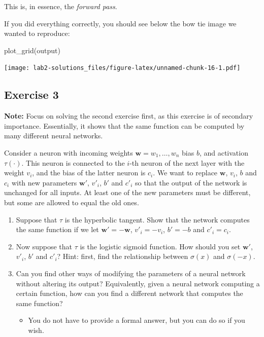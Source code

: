 \documentclass[
]{article}
\newenvironment{Shaded}{\begin{snugshade}}{\end{snugshade}}
\newcommand{\FunctionTok}[1]{\textcolor[rgb]{0.00,0.00,0.00}{#1}}
\newcommand{\NormalTok}[1]{#1}
\providecommand{\tightlist}{%
  \setlength{\itemsep}{0pt}\setlength{\parskip}{0pt}}
\begin{document}
This is, in essence, the \emph{forward pass}.

If you did everything correctly, you should see below the bow tie image
we wanted to reproduce:

\begin{Shaded}
\begin{Highlighting}[]
\FunctionTok{plot\_grid}\NormalTok{(output)}
\end{Highlighting}
\end{Shaded}

\texttt{[image: lab2-solutions\_files/figure-latex/unnamed-chunk-16-1.pdf]}

\hypertarget{exercise-3}{%
\subsection{Exercise 3}\label{exercise-3}}

\textbf{Note:} Focus on solving the second exercise first, as this
exercise is of secondary importance. Essentially, it shows that the same
function can be computed by many different neural networks.

Consider a neuron with incoming weights \(\textbf{w}=w_1,\ldots,w_n\)
bias \(b\), and activation \(\tau(\cdot)\). This neuron is connected to
the \(i\)-th neuron of the next layer with the weight \(v_i\), and the
bias of the latter neuron is \(c_i\). We want to replace \(\textbf{w}\),
\(v_i\), \(b\) and \(c_i\) with new parameters \(\textbf{w}'\),
\(v'_i\), \(b'\) and \(c'_i\) so that the output of the network is
unchanged for all inputs. At least one of the new parameters must be
different, but some are allowed to equal the old ones.

\begin{enumerate}
\def\labelenumi{\arabic{enumi}.}
\tightlist
\item
  Suppose that \(\tau\) is the hyperbolic tangent. Show that the network
  computes the same function if we let \(\textbf{w}'=-\textbf{w}\),
  \(v'_i=-v_i\), \(b'=-b\) and \(c'_i=c_i\).
\item
  Now suppose that \(\tau\) is the logistic sigmoid function. How should
  you set \(\textbf{w}'\), \(v'_i\), \(b'\) and \(c'_i\)? Hint: first,
  find the relationship between \(\sigma(x)\) and \(\sigma(-x)\).
\item
  Can you find other ways of modifying the parameters of a neural
  network without altering its output? Equivalently, given a neural
  network computing a certain function, how can you find a different
  network that computes the same function?

  \begin{itemize}
  \tightlist
  \item
    You do not have to provide a formal answer, but you can do so if you
    wish.
  \end{itemize}
\end{enumerate}
\end{document}
